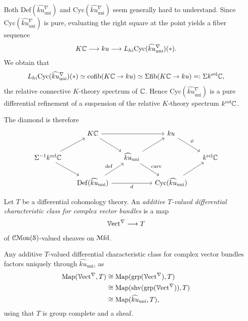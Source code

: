 \documentclass[10pt]{amsart}
\begin{document}
\begin{remark}
Both $\mathrm{Def}(\widehat{ku}{}^\nabla_{\mathrm{uni}})$ and $\mathrm{Cyc}(\widehat{ku}{}^\nabla_{\mathrm{uni}})$ seem generally hard to understand. Since $\mathrm{Cyc}(\widehat{ku}{}^\nabla_{\mathrm{uni}})$ is pure, evaluating the right square at the point yields a fiber sequence
\[
K\mathbb{C} \longrightarrow ku \longrightarrow L_{hi}\mathrm{Cyc}(\widehat{ku}{}^\nabla_{\mathrm{uni}})(*).
\]
We obtain that
\[
L_{hi}\mathrm{Cyc}(\widehat{ku}{}^\nabla_{\mathrm{uni}})(*) \simeq \mathrm{cofib}(K\mathbb{C} \to ku) \simeq \Sigma\mathrm{fib}(K\mathbb{C} \to ku) =: \Sigma k^{\mathrm{rel}}\mathbb{C},
\]
the relative connective $K$-theory spectrum of $\mathbb{C}$. Hence $\mathrm{Cyc}(\widehat{ku}{}^\nabla_{\mathrm{uni}})$ is a pure differential refinement of a suspension of the relative $K$-theory spectrum $ k^{\mathrm{rel}}\mathbb{C}$. 
\end{remark}

The diamond is therefore
\begin{equation*}
\begin{tikzcd}[column sep=0.5cm]
& 
K\bC 
\ar[dr]\ar[rr]
& & 
ku 
\ar[dr, "\phi"] 
&
\\ 	
\Sigma^{-1} k^{\mathrm{rel}}\bC
\ar[ur]
\ar[dr]
& & 
\widehat{ku}_{\mathrm{uni}}
\ar[ur]
\ar[dr, "\mathrm{curv}"]
& & 
k^{\mathrm{rel}}\bC
\\
& 
\mathrm{Def}(\widehat{ku}{}_{\mathrm{uni}})
\ar[ur, "\mathrm{def}"]
\ar[rr, "d"']
& & 
\mathrm{Cyc}(\widehat{ku}{}_{\mathrm{uni}}) 
\ar[ur]
&
\end{tikzcd}
\end{equation*}



\begin{definition}\cite[Remark 6.6]{bunkenikolausvoelkl2016diffcoh}
Let $T$ be a differential cohomology theory. An \emph{additive $T$-valued differential characteristic class for complex vector bundles} is a map
\[
\mathcal{V}\mathrm{ect}^\nabla \longrightarrow T
\]
of $\mathcal{C}\mathcal{M}\mathrm{on}(\mathcal{S})$-valued sheaves on $\mathcal{M}\mathrm{fd}$.
\end{definition}

\begin{remark}
\label{RemarkUniqueFactorization}
Any additive $T$-valued differential characteristic class for complex vector bundles factors uniquely through $\widehat{ku}_{\mathrm{uni}}$, as
\begin{align*}
\mathrm{Map}(\mathcal{V}\mathrm{ect}^\nabla,  T)
&\cong 
\mathrm{Map}(\mathrm{grp}(\mathcal{V}\mathrm{ect}^\nabla),  T)
\\
&\cong 
\mathrm{Map}(\mathrm{shv}(\mathrm{grp}(\mathcal{V}\mathrm{ect}^\nabla)),  T)
\\
&\cong 
\mathrm{Map}(\widehat{ku}{}_{\mathrm{uni}},  T),
\end{align*}
using that $T$ is group complete and a sheaf.
\end{remark}
\end{document}
